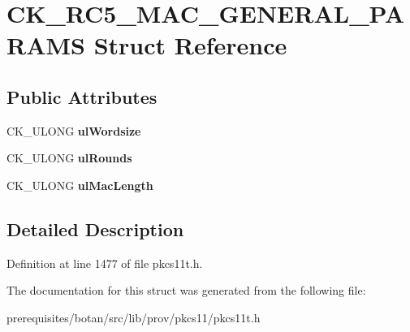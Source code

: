 \hypertarget{struct_c_k___r_c5___m_a_c___g_e_n_e_r_a_l___p_a_r_a_m_s}{}\section{C\+K\+\_\+\+R\+C5\+\_\+\+M\+A\+C\+\_\+\+G\+E\+N\+E\+R\+A\+L\+\_\+\+P\+A\+R\+A\+MS Struct Reference}
\label{struct_c_k___r_c5___m_a_c___g_e_n_e_r_a_l___p_a_r_a_m_s}
\subsection*{Public Attributes}
\begin{DoxyCompactItemize}
\item 
\mbox{\label{struct_c_k___r_c5___m_a_c___g_e_n_e_r_a_l___p_a_r_a_m_s_ab5c8eda50a02ba6eb5f418be440f2f16}} 
C\+K\+\_\+\+U\+L\+O\+NG {\bfseries ul\+Wordsize}
\item 
\mbox{\label{struct_c_k___r_c5___m_a_c___g_e_n_e_r_a_l___p_a_r_a_m_s_a4159d1166521a81e37d733545e4fa33a}} 
C\+K\+\_\+\+U\+L\+O\+NG {\bfseries ul\+Rounds}
\item 
\mbox{\label{struct_c_k___r_c5___m_a_c___g_e_n_e_r_a_l___p_a_r_a_m_s_a31039f2bba7398cc408c830a3b6010e8}} 
C\+K\+\_\+\+U\+L\+O\+NG {\bfseries ul\+Mac\+Length}
\end{DoxyCompactItemize}


\subsection{Detailed Description}


Definition at line 1477 of file pkcs11t.\+h.



The documentation for this struct was generated from the following file\+:\begin{DoxyCompactItemize}
\item 
prerequisites/botan/src/lib/prov/pkcs11/pkcs11t.\+h\end{DoxyCompactItemize}

